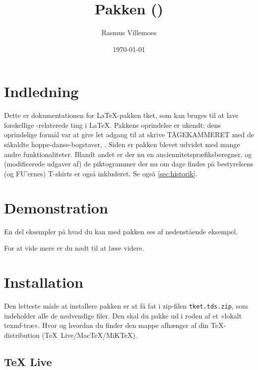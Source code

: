 \documentclass[a4paper,article,oneside,danish]{memoir}
\title{Pakken \ptket (\pTKETVer)}
\author{Rasmus Villemoes}
\date{\today}
\newcommand{\pakkenavn}[1]{\textsf{#1}}
\newcommand{\ptket}{\pakkenavn{tket}\xspace}
\newcommand{\filnavn}[1]{\texttt{#1}}
\newenvironment{resultat}{%
  \begin{adjustwidth}{15mm}{15mm}%
    \begin{qshade}%
    }{%
    \end{qshade}%
  \end{adjustwidth}}
\begin{document}
\maketitle

\tableofcontents*

\section{Indledning}
\label{cha:indledning}

Dette er dokumentationen for \LaTeX-pakken \ptket, som kan bruges til
at lave forskellige \TK-relaterede ting i \LaTeX. Pakkens oprindelse
er ukendt; dens oprindelige formål var at give let adgang til at
skrive \hbox{TÅGEKAMMERET} med de såkaldte hoppe-danse-bogstaver,
\TKET. Siden er pakken blevet udvidet med mange andre
funktionaliteter. Blandt andet er der nu en
anciennitetspræfiksberegner, og (modificerede udgaver af) de
piktogrammer der nu om dage findes på bestyrelsens (og FU'ernes)
T-shirts er også inkluderet. Se også \vref{sec:historik}.

\section{Demonstration}
\label{cha:demonstration}

En del eksempler på hvad du kan med pakken ses af nedenstående
eksempel.


\begin{resultat}

\end{resultat}

For at vide mere er du nødt til at læse videre.

\section{Installation}
\label{cha:installation}

Den letteste måde at installere pakken er at få fat i zip-filen
\filnavn{tket.tds.zip}, som indeholder alle de nødvendige filer. Den
skal du pakke ud i roden af et »lokalt texmf-træ«. Hvor og hvordan du
finder den mappe afhænger af din \TeX-distribution (\mbox{\TeX{}
  Live}/\mbox{Mac\TeX}/\mbox{MiK\TeX}).

\subsection{\TeX{} Live}
\label{sec:tex-live}
\end{document}
